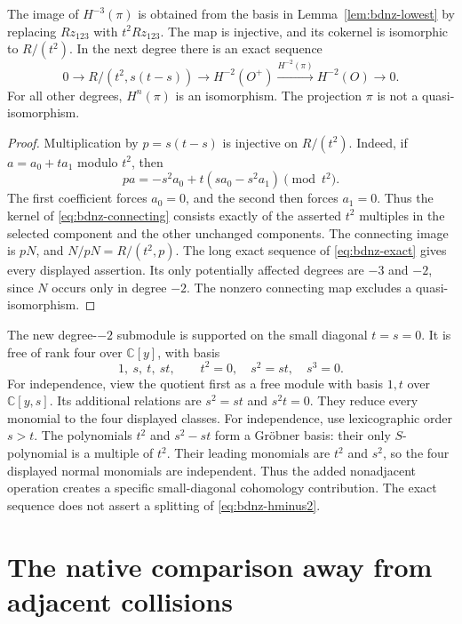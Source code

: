 \begin{theorem}\label{thm:bdnz-cohomology}
The image of $H^{-3}(\pi)$ is obtained from the basis in Lemma~\ref{lem:bdnz-lowest} by replacing $Rz_{123}$ with $t^2Rz_{123}$.
The map is injective, and its cokernel is isomorphic to $R/(t^2)$.
In the next degree there is an exact sequence
\begin{equation}\label{eq:bdnz-hminus2}
 0\longrightarrow R/(t^2,s(t-s))
 \longrightarrow H^{-2}(O^+)
 \xrightarrow{H^{-2}(\pi)}H^{-2}(O)\longrightarrow0.
\end{equation}
For all other degrees, $H^n(\pi)$ is an isomorphism.
The projection $\pi$ is not a quasi-isomorphism.
\end{theorem}
\begin{proof}
Multiplication by $p=s(t-s)$ is injective on $R/(t^2)$.
Indeed, if $a=a_0+t a_1$ modulo $t^2$, then
\[
 pa=-s^2a_0+t(sa_0-s^2a_1)\pmod {t^2}.
\]
The first coefficient forces $a_0=0$, and the second then forces $a_1=0$.
Thus the kernel of \eqref{eq:bdnz-connecting} consists exactly of the asserted $t^2$ multiples in the selected component and the other unchanged components.
The connecting image is $pN$, and $N/pN=R/(t^2,p)$.
The long exact sequence of \eqref{eq:bdnz-exact} gives every displayed assertion.
Its only potentially affected degrees are $-3$ and $-2$, since $N$ occurs only in degree $-2$.
The nonzero connecting map excludes a quasi-isomorphism.
\end{proof}

The new degree-$-2$ submodule is supported on the small diagonal $t=s=0$.
It is free of rank four over $\mathbb C[y]$, with basis
\begin{equation}\label{eq:bdnz-lengthfour}
 1,\ s,\ t,\ st,
 \qquad t^2=0,\quad s^2=st,\quad s^3=0.
\end{equation}
For independence, view the quotient first as a free module with basis $1,t$ over $\mathbb C[y,s]$.
Its additional relations are $s^2=st$ and $s^2t=0$.
They reduce every monomial to the four displayed classes.
For independence, use lexicographic order $s>t$.
The polynomials $t^2$ and $s^2-st$ form a Gr\"obner basis: their only $S$-polynomial is a multiple of $t^2$.
Their leading monomials are $t^2$ and $s^2$, so the four displayed normal monomials are independent.
Thus the added nonadjacent operation creates a specific small-diagonal cohomology contribution.
The exact sequence does not assert a splitting of \eqref{eq:bdnz-hminus2}.

\section{The native comparison away from adjacent collisions}

